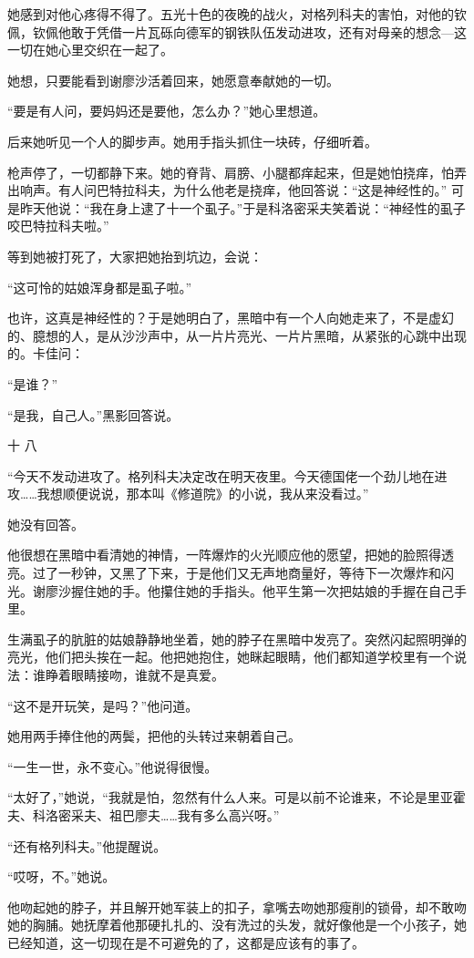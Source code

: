 她感到对他心疼得不得了。五光十色的夜晚的战火，对格列科夫的害怕，对他的钦佩，钦佩他敢于凭借一片瓦砾向德军的钢铁队伍发动进攻，还有对母亲的想念—这一切在她心里交织在一起了。

她想，只要能看到谢廖沙活着回来，她愿意奉献她的一切。

“要是有人问，要妈妈还是要他，怎么办？”她心里想道。

后来她听见一个人的脚步声。她用手指头抓住一块砖，仔细听着。

枪声停了，一切都静下来。她的脊背、肩膀、小腿都痒起来，但是她怕挠痒，怕弄出响声。有人问巴特拉科夫，为什么他老是挠痒，他回答说：“这是神经性的。” 可是昨天他说：“我在身上逮了十一个虱子。”于是科洛密采夫笑着说：“神经性的虱子咬巴特拉科夫啦。”

等到她被打死了，大家把她抬到坑边，会说：

“这可怜的姑娘浑身都是虱子啦。”

也许，这真是神经性的？于是她明白了，黑暗中有一个人向她走来了，不是虚幻的、臆想的人，是从沙沙声中，从一片片亮光、一片片黑暗，从紧张的心跳中出现的。卡佳问：

“是谁？”

“是我，自己人。”黑影回答说。

十 八

“今天不发动进攻了。格列科夫决定改在明天夜里。今天德国佬一个劲儿地在进攻……我想顺便说说，那本叫《修道院》的小说，我从来没看过。”

她没有回答。

他很想在黑暗中看清她的神情，一阵爆炸的火光顺应他的愿望，把她的脸照得透亮。过了一秒钟，又黑了下来，于是他们又无声地商量好，等待下一次爆炸和闪光。谢廖沙握住她的手。他攥住她的手指头。他平生第一次把姑娘的手握在自己手里。

生满虱子的肮脏的姑娘静静地坐着，她的脖子在黑暗中发亮了。突然闪起照明弹的亮光，他们把头挨在一起。他把她抱住，她眯起眼睛，他们都知道学校里有一个说法：谁睁着眼睛接吻，谁就不是真爱。

“这不是开玩笑，是吗？”他问道。

她用两手捧住他的两鬓，把他的头转过来朝着自己。

“一生一世，永不变心。”他说得很慢。

“太好了，”她说，“我就是怕，忽然有什么人来。可是以前不论谁来，不论是里亚霍夫、科洛密采夫、祖巴廖夫……我有多么高兴呀。”

“还有格列科夫。”他提醒说。

“哎呀，不。”她说。

他吻起她的脖子，并且解开她军装上的扣子，拿嘴去吻她那瘦削的锁骨，却不敢吻她的胸脯。她抚摩着他那硬扎扎的、没有洗过的头发，就好像他是一个小孩子，她已经知道，这一切现在是不可避免的了，这都是应该有的事了。

